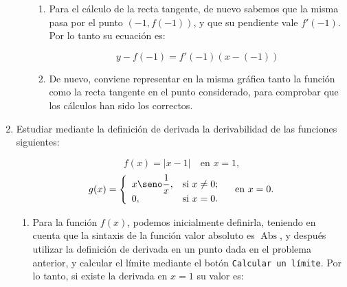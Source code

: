 \begin{enumerate}[leftmargin=*]
\begin{enumerate}
\begin{indication}
{\begin{enumerate}
\[
f'(a) = \mathop {\lim }\limits_{h \to 0} \frac{{f(a + h) - f(a)}}
{h}
\]
en donde, por aligerar la notación, hemos llamado $h$ a lo que en
la teoría denominábamos $\Delta x$.

Por lo tanto, para calcular la derivada de la función $f$ en
$a=-1$ mediante la definición, procedemos con:

\[
f'(-1) = \mathop {\lim }\limits_{h \to 0} \frac{{f(-1 + h) -
f(-1)}} {h}
\]

Para calcular el límite, podemos utilizar el botón
\texttt{Calcular un límite} de la barra de botones.

\item Para el cálculo de la recta tangente, de nuevo sabemos que
la misma pasa por el punto $(-1, f(-1))$, y que su pendiente vale
$f'(-1)$. Por lo tanto su ecuación es:

\[
y - f( - 1) = f'(-1)\left( {x - ( - 1)} \right)
\]

\item De nuevo, conviene representar en la misma gráfica tanto la
función como la recta tangente en el punto considerado, para
comprobar que los cálculos han sido los correctos.

\end{enumerate}
}
\end{indication}


\end{enumerate}




\item Estudiar mediante la definición de derivada la derivabilidad
de las funciones siguientes:


\[
f(x)=|x-1| \quad \textrm{en $x=1$,}
\]
\[
g(x)=\left\{%
\begin{array}{ll}
   x \seno\dfrac{1}{x}, & \hbox{si $x\neq 0$;} \\
   0, & \hbox{si $x=0$.} \\
\end{array}%
\right. \quad \textrm{en $x=0$.}
\]

\begin{indication}
{
\begin{enumerate}
\item Para la función $f(x)$, podemos inicialmente definirla,
teniendo en cuenta que la sintaxis de la función valor absoluto es
$\operatorname{Abs}$, y después utilizar la definición de derivada
en un punto dada en el problema anterior, y calcular el límite
mediante el botón \texttt{Calcular un límite}. Por lo tanto, si
existe la derivada en $x=1$ su valor es:



\end{enumerate}}
\end{indication}
\end{enumerate}
